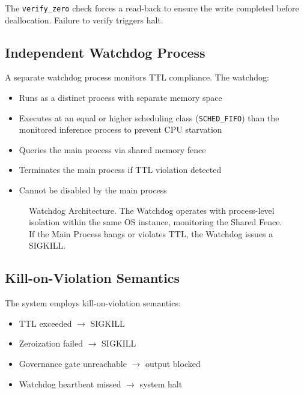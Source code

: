 \documentclass[conference]{IEEEtran}
\begin{document}
The \texttt{verify\_zero} check forces a read-back to ensure the write completed before deallocation. Failure to verify triggers halt.

\subsection{Independent Watchdog Process}
A separate watchdog process monitors TTL compliance. The watchdog:
\begin{itemize}
    \item Runs as a distinct process with separate memory space
    \item Executes at an equal or higher scheduling class (\texttt{SCHED\_FIFO}) than the monitored inference process to prevent CPU starvation
    \item Queries the main process via shared memory fence
    \item Terminates the main process if TTL violation detected
    \item Cannot be disabled by the main process
\end{itemize}

\begin{figure}[htbp]
\centering
{}
\caption{Watchdog Architecture. The Watchdog operates with process-level isolation within the same OS instance, monitoring the Shared Fence. If the Main Process hangs or violates TTL, the Watchdog issues a SIGKILL.}
\label{fig:watchdog}
\end{figure}

\subsection{Kill-on-Violation Semantics}
The system employs kill-on-violation semantics:
\begin{itemize}
    \item TTL exceeded $\rightarrow$ SIGKILL
    \item Zeroization failed $\rightarrow$ SIGKILL
    \item Governance gate unreachable $\rightarrow$ output blocked
    \item Watchdog heartbeat missed $\rightarrow$ system halt
\end{itemize}
\end{document}
